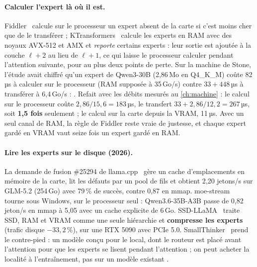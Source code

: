\paragraph{Calculer l'expert là où il est.} Fiddler~\cite{fiddler2025} calcule sur le processeur un expert absent de la carte si c'est moins cher que de le transférer ; KTransformers~\cite{ktransformers2025} calcule les experts en RAM avec des noyaux AVX-512 et AMX et \emph{reporte} certains experts : leur sortie est ajoutée à la couche $\ell+2$ au lieu de $\ell+1$, ce qui laisse le processeur calculer pendant l'attention suivante, pour au plus deux points de perte. Sur la machine de Stone, l'étude avait chiffré qu'un expert de Qwen3-30B (2,86\,Mo en Q4\_K\_M) coûte 82\,µs à calculer sur le processeur (RAM supposée à 35\,Go/s) contre $33 + 448$\,µs à transférer à 6,4\,Go/s : . Refait avec les débits mesurés au \cref{ch:machine} \calc : le calcul sur le processeur coûte $2{,}86/15{,}6 = 183$\,µs, le transfert $33 + 2{,}86/12{,}2 = 267$\,µs, soit \textbf{1,5 fois} seulement ; le calcul sur la carte depuis la VRAM, 11\,µs. Avec un seul canal de RAM, la règle de Fiddler reste vraie de justesse, et chaque expert gardé en VRAM vaut seize fois un expert gardé en RAM.

\paragraph{Lire les experts sur le disque (2026).} La demande de fusion \#25294 de llama.cpp~\cite{llamapr25294} gère un cache d'emplacements en mémoire de la carte, lit les défauts par un pool de fils et obtient 2,20 jetons/s sur GLM-5.2 (254\,Go) avec 79\,\% de succès, contre 0,87 en mmap. moe-stream~\cite{moestream2026} tourne sous Windows, sur le processeur seul : Qwen3.6-35B-A3B passe de 0,82 jeton/s en mmap à 5,05 avec un cache explicite de 6\,Go. SSD-LLaMA~\cite{ssdllama2026} traite SSD, RAM et VRAM comme une seule hiérarchie et \textbf{compresse les experts} (trafic disque $-33{,}2$\,\%), sur une RTX 5090 avec PCIe 5.0. SmallThinker~\cite{smallthinker2025} prend le contre-pied : un modèle conçu pour le local, dont le routeur est placé avant l'attention pour que les experts se lisent pendant l'attention ; on peut acheter la localité à l'entraînement, pas sur un modèle existant \litt.

